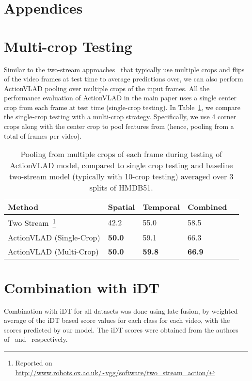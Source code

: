 \documentclass[10pt,twocolumn,letterpaper]{article}
\newcommand{\methodTag}[0]{ActionVLAD}
\newcommand{\tableSize}[0]{\scriptsize}
\begin{document}
{\small


}

\clearpage
\appendix

\section*{Appendices}

\section{Multi-crop Testing}
Similar to the two-stream approaches~\cite{WangL_15_GoodPrac,WangL_16a} that typically use multiple crops and flips of the video frames at test time to average predictions over, we can also perform \methodTag{} pooling over multiple crops of the input frames.
All the performance evaluation of \methodTag{} in the main paper
uses a single center crop from each frame at test time (single-crop testing).
In Table~\ref{tab:multi-crop}, we 
compare the single-crop testing with 
a multi-crop strategy. Specifically, we use 4 corner
crops along with the center crop to pool features
from (hence, pooling from a total of
 frames per video).

\begin{table}[t]
\caption{Pooling from multiple crops of each frame
during testing of \methodTag{} model, compared to
single crop testing and baseline two-stream model
  (typically with 10-crop testing) averaged over 3 splits of HMDB51.
}\label{tab:multi-crop}
\tableSize{}
\centering
\begin{tabular}{lllll}
\toprule
  Method    & Spatial & Temporal & Combined \\
\midrule
  Two Stream~\cite{WangL_15_GoodPrac,WangX_16a}\footnote{Reported on \url{http://www.robots.ox.ac.uk/~vgg/software/two_stream_action/}} & 42.2 & 55.0 & 58.5 & \\
  \methodTag{} (Single-Crop) & {\bf 50.0} & 59.1 & 66.3 \\
  \methodTag{} (Multi-Crop) & {\bf 50.0} & {\bf 59.8} & {\bf 66.9} \\
\bottomrule
\end{tabular}
\end{table}


\section{Combination with iDT}
Combination with iDT for all datasets was done using late fusion, by weighted 
average of the iDT based score values for each class for each video, with the scores
predicted by our model. The iDT scores were obtained from the authors of~\cite{Varol_16}
and~\cite{charades} respectively.
\end{document}

